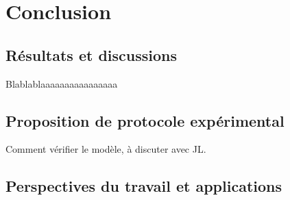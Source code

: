 \chapter{Conclusion}

\section{Résultats et discussions}
Blablablaaaaaaaaaaaaaaaa

\section{Proposition de protocole expérimental}
Comment vérifier le modèle, à discuter avec JL.

\section{Perspectives du travail et applications}